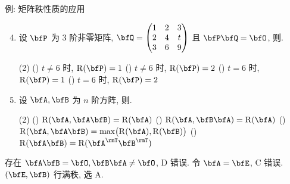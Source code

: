 \begin{frame}{例: 矩阵秩性质的应用}\small
	\onslide<+->
	\begin{exercise}
		\begin{enumerate}
			\setcounter{enumi}{3}
			\item 设 $\bfP$ 为 $3$ 阶非零矩阵, $\bfQ=\begin{pmatrix}
				1&2&3\\
				2&4&t\\
				3&6&9
			\end{pmatrix}$ 且 $\bfP\bfQ=\bfO$, 则.
			\begin{exchoice}(2)
				() $t\neq 6$ 时, $\rank(\bfP)=1$
				() $t\neq 6$ 时, $\rank(\bfP)=2$
				() $t=6$ 时, $\rank(\bfP)=1$
				() $t=6$ 时, $\rank(\bfP)=2$
			\end{exchoice}
			\item 设 $\bfA,\bfB$ 为 $n$ 阶方阵, 则.
			\begin{exchoice}(2)
				() $\rank(\bfA,\bfA\bfB)=\rank(\bfA)$
				() $\rank(\bfA,\bfB\bfA)=\rank(\bfA)$
				() $\rank(\bfA,\bfA\bfB)=\max\bigl(\rank(\bfA),\rank(\bfB)\bigr)$
				() $\rank(\bfA\bfB)=\rank(\bfA^\rmT\bfB^\rmT)$
			\end{exchoice}
		\end{enumerate}
	\end{exercise}
	\onslide<+->
	\begin{answer}
		存在 $\bfA\bfB=\bfO,\bfB\bfA\neq \bfO$, D 错误.
		令 $\bfA=\bfE$, C 错误.
		$(\bfE,\bfB)$ 行满秩, 选 A.
	\end{answer}
\end{frame}


